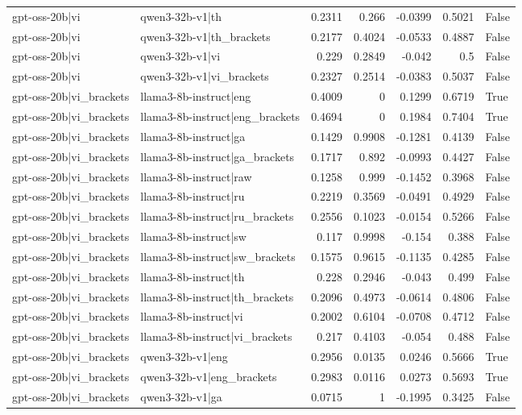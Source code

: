 \begin{table}
\begin{tabular}{l l r r r r l}
gpt-oss-20b|vi & qwen3-32b-v1|th & 0.2311 & 0.266 & -0.0399 & 0.5021 & False \\
gpt-oss-20b|vi & qwen3-32b-v1|th_brackets & 0.2177 & 0.4024 & -0.0533 & 0.4887 & False \\
gpt-oss-20b|vi & qwen3-32b-v1|vi & 0.229 & 0.2849 & -0.042 & 0.5 & False \\
gpt-oss-20b|vi & qwen3-32b-v1|vi_brackets & 0.2327 & 0.2514 & -0.0383 & 0.5037 & False \\
gpt-oss-20b|vi_brackets & llama3-8b-instruct|eng & 0.4009 & 0 & 0.1299 & 0.6719 & True \\
gpt-oss-20b|vi_brackets & llama3-8b-instruct|eng_brackets & 0.4694 & 0 & 0.1984 & 0.7404 & True \\
gpt-oss-20b|vi_brackets & llama3-8b-instruct|ga & 0.1429 & 0.9908 & -0.1281 & 0.4139 & False \\
gpt-oss-20b|vi_brackets & llama3-8b-instruct|ga_brackets & 0.1717 & 0.892 & -0.0993 & 0.4427 & False \\
gpt-oss-20b|vi_brackets & llama3-8b-instruct|raw & 0.1258 & 0.999 & -0.1452 & 0.3968 & False \\
gpt-oss-20b|vi_brackets & llama3-8b-instruct|ru & 0.2219 & 0.3569 & -0.0491 & 0.4929 & False \\
gpt-oss-20b|vi_brackets & llama3-8b-instruct|ru_brackets & 0.2556 & 0.1023 & -0.0154 & 0.5266 & False \\
gpt-oss-20b|vi_brackets & llama3-8b-instruct|sw & 0.117 & 0.9998 & -0.154 & 0.388 & False \\
gpt-oss-20b|vi_brackets & llama3-8b-instruct|sw_brackets & 0.1575 & 0.9615 & -0.1135 & 0.4285 & False \\
gpt-oss-20b|vi_brackets & llama3-8b-instruct|th & 0.228 & 0.2946 & -0.043 & 0.499 & False \\
gpt-oss-20b|vi_brackets & llama3-8b-instruct|th_brackets & 0.2096 & 0.4973 & -0.0614 & 0.4806 & False \\
gpt-oss-20b|vi_brackets & llama3-8b-instruct|vi & 0.2002 & 0.6104 & -0.0708 & 0.4712 & False \\
gpt-oss-20b|vi_brackets & llama3-8b-instruct|vi_brackets & 0.217 & 0.4103 & -0.054 & 0.488 & False \\
gpt-oss-20b|vi_brackets & qwen3-32b-v1|eng & 0.2956 & 0.0135 & 0.0246 & 0.5666 & True \\
gpt-oss-20b|vi_brackets & qwen3-32b-v1|eng_brackets & 0.2983 & 0.0116 & 0.0273 & 0.5693 & True \\
gpt-oss-20b|vi_brackets & qwen3-32b-v1|ga & 0.0715 & 1 & -0.1995 & 0.3425 & False \\

\end{tabular}
\end{table}

